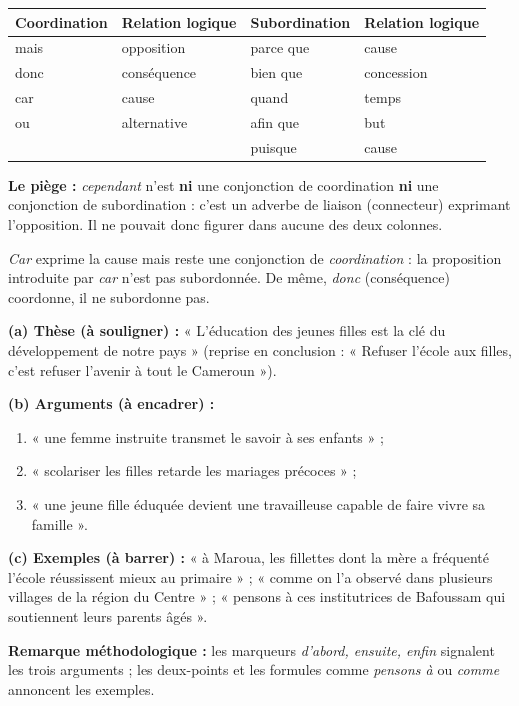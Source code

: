 \documentclass[11pt]{article}
\newcommand{\cle}[1]{{\popxbold\color{popdark}#1}}
\begin{document}
\begin{corrige}
\begin{center}
\begin{tabularx}{\linewidth}{|l|X|l|X|}
\hline
\rowcolor{popblueL} \textbf{Coordination} & \textbf{Relation logique} & \textbf{Subordination} & \textbf{Relation logique} \\
\hline
mais & opposition & parce que & cause \\
\hline
donc & conséquence & bien que & concession \\
\hline
car & cause & quand & temps \\
\hline
ou & alternative & afin que & but \\
\hline
& & puisque & cause \\
\hline
\end{tabularx}
\end{center}
\textbf{Le piège :} \emph{cependant} n'est \textbf{ni} une conjonction de coordination \textbf{ni} une conjonction de subordination : c'est un \cle{adverbe de liaison} (connecteur) exprimant l'opposition. Il ne pouvait donc figurer dans aucune des deux colonnes.
\begin{attention}
\emph{Car} exprime la cause mais reste une conjonction de \emph{coordination} : la proposition introduite par \emph{car} n'est pas subordonnée. De même, \emph{donc} (conséquence) coordonne, il ne subordonne pas.
\end{attention}
\end{corrige}

\begin{corrige}
\textbf{(a) Thèse (à souligner) :} « L'éducation des jeunes filles est la clé du développement de notre pays » (reprise en conclusion : « Refuser l'école aux filles, c'est refuser l'avenir à tout le Cameroun »).

\textbf{(b) Arguments (à encadrer) :}
\begin{enumerate}
\item « une femme instruite transmet le savoir à ses enfants » ;
\item « scolariser les filles retarde les mariages précoces » ;
\item « une jeune fille éduquée devient une travailleuse capable de faire vivre sa famille ».
\end{enumerate}

\textbf{(c) Exemples (à barrer) :} « à Maroua, les fillettes dont la mère a fréquenté l'école réussissent mieux au primaire » ; « comme on l'a observé dans plusieurs villages de la région du Centre » ; « pensons à ces institutrices de Bafoussam qui soutiennent leurs parents âgés ».

\textbf{Remarque méthodologique :} les marqueurs \emph{d'abord, ensuite, enfin} signalent les trois arguments ; les deux-points et les formules comme \emph{pensons à} ou \emph{comme} annoncent les exemples.
\end{corrige}
\end{document}
